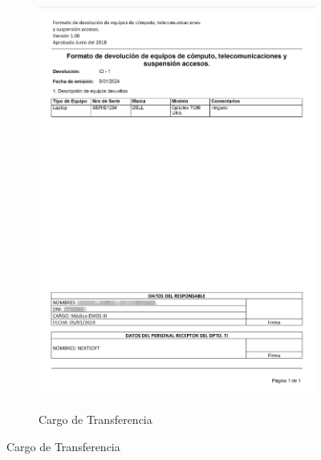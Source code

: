 \documentclass[stu, 12pt, letterpaper, donotrepeattitle, floatsintext, natbib]{apa7}
\begin{document}
\begin{figure}[h]
\begin{subfigure}[b]{0.3\textwidth}
        \includegraphics[width=\textwidth]{./images/reporteDevolucion.png}
    \end{subfigure}
    \hfill
    \begin{subfigure}[b]{0.3\textwidth}
        \centering
        \caption{Cargo de Transferencia}\label{cargoTransferencia}

\end{subfigure}
\end{figure}
\end{document}
